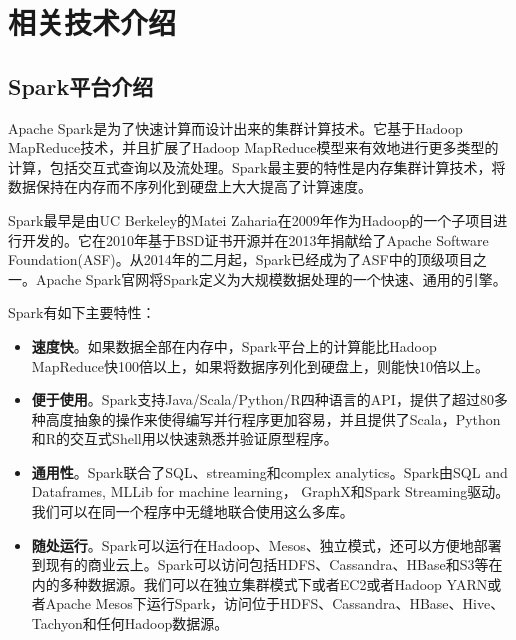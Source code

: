 \chapter{相关技术介绍}
\section{Spark平台介绍}
Apache Spark\cite{zaharia2010spark}是为了快速计算而设计出来的集群计算技术。它基于Hadoop MapReduce技术，并且扩展了Hadoop MapReduce模型来有效地进行更多类型的计算，包括交互式查询以及流处理。Spark最主要的特性是内存集群计算技术，将数据保持在内存而不序列化到硬盘上大大提高了计算速度。

Spark最早是由UC Berkeley的Matei Zaharia在2009年作为Hadoop的一个子项目进行开发的。它在2010年基于BSD证书开源并在2013年捐献给了Apache Software Foundation(ASF)。从2014年的二月起，Spark已经成为了ASF中的顶级项目之一。Apache Spark官网将Spark定义为大规模数据处理的一个快速、通用的引擎。

Spark有如下主要特性：
\begin{itemize}
    \item \textbf{速度快}。如果数据全部在内存中，Spark平台上的计算能比Hadoop MapReduce快100倍以上，如果将数据序列化到硬盘上，则能快10倍以上。
    \item \textbf{便于使用}。Spark支持Java/Scala/Python/R四种语言的API，提供了超过80多种高度抽象的操作来使得编写并行程序更加容易，并且提供了Scala，Python和R的交互式Shell用以快速熟悉并验证原型程序。
    \item \textbf{通用性}。Spark联合了SQL、streaming和complex analytics。Spark由SQL and Dataframes, MLLib for machine learning\cite{meng2015mllib}， GraphX和Spark Streaming驱动。我们可以在同一个程序中无缝地联合使用这么多库。
    \item \textbf{随处运行}。Spark可以运行在Hadoop、Mesos、独立模式，还可以方便地部署到现有的商业云上。Spark可以访问包括HDFS、Cassandra、HBase和S3等在内的多种数据源。我们可以在独立集群模式下或者EC2或者Hadoop YARN或者Apache Mesos下运行Spark，访问位于HDFS、Cassandra、HBase、Hive、Tachyon和任何Hadoop数据源。
\end{itemize}

